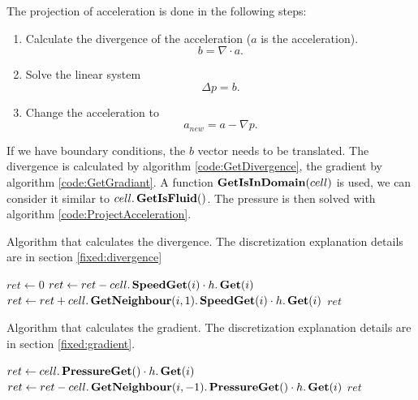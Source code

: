 The projection of acceleration is done in the following steps:
\begin{enumerate}
 \item Calculate the divergence of the acceleration ($a$ is the acceleration).
 \begin{equation}
  b=\nabla \cdot a.
 \end{equation}
 \item Solve the linear system
 \begin{equation}
  \Delta p=b.
 \end{equation}
 \item Change the acceleration to
 \begin{equation}
  a_{new}=a-\nabla p.
 \end{equation}
\end{enumerate}
If we have boundary conditions, the $b$ vector needs to be translated.
The divergence is calculated by algorithm \ref{code:GetDivergence}, the gradient by algorithm \ref{code:GetGradiant}.
A function $\mathop{\textbf{GetIsInDomain}}(cell)$ is used, we can consider it similar to $cell.\mathop{\textbf{GetIsFluid}}()$.
The pressure is then solved with algorithm \ref{code:ProjectAcceleration}.

\begin{algorithm}
\caption{Algorithm that calculates the divergence. The discretization explanation details are in section \ref{fixed:divergence}}
\label{code:GetDivergence}
\begin{algorithmic}[1]
		\State $ret\gets 0$
			\State $ret\gets ret-cell.\mathop{\textbf{SpeedGet}}(i)\cdot h.\mathop{\textbf{Get}}(i)$
			\State $ret\gets ret+cell.\mathop{\textbf{GetNeighbour}}(i,1).\mathop{\textbf{SpeedGet}}(i) \cdot h.\mathop{\textbf{Get}}(i)$
		\EndFor
		\State \Return $ret$
	\EndFunction
	 \end{algorithmic}
\end{algorithm}

\begin{algorithm}
\caption{Algorithm that calculates the gradient. The discretization explanation details are in section \ref{fixed:gradient}.}
\label{code:GetGradiant}
\begin{algorithmic}[1]
		\State $ret\gets cell.\mathop{\textbf{PressureGet}}()\cdot h.\mathop{\textbf{Get}}(i)$
		\State $ret\gets ret-cell.\mathop{\textbf{GetNeighbour}}(i,-1).\mathop{\textbf{PressureGet}}()\cdot h.\mathop{\textbf{Get}}(i)$
		\State \Return $ret$
\EndFunction
		 \end{algorithmic}
\end{algorithm}

